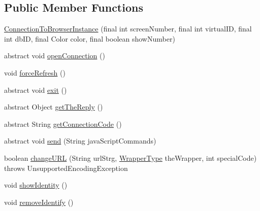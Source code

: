\subsection*{Public Member Functions}
\begin{DoxyCompactItemize}
\item 
\hyperlink{classgov_1_1fnal_1_1ppd_1_1dd_1_1display_1_1client_1_1ConnectionToBrowserInstance_a5e820932a7dcbbed0c7415a58126344f}{Connection\-To\-Browser\-Instance} (final int screen\-Number, final int virtual\-I\-D, final int db\-I\-D, final Color color, final boolean show\-Number)
\item 
abstract void \hyperlink{classgov_1_1fnal_1_1ppd_1_1dd_1_1display_1_1client_1_1ConnectionToBrowserInstance_a6ea35c69c6beea9fc6432c7cdd969d63}{open\-Connection} ()
\item 
void \hyperlink{classgov_1_1fnal_1_1ppd_1_1dd_1_1display_1_1client_1_1ConnectionToBrowserInstance_abc6c5f397d2c3caa8120f0c5fc162eac}{force\-Refresh} ()
\item 
abstract void \hyperlink{classgov_1_1fnal_1_1ppd_1_1dd_1_1display_1_1client_1_1ConnectionToBrowserInstance_aa27f7bfb9140d6e4a7cd445cdade8460}{exit} ()
\item 
abstract Object \hyperlink{classgov_1_1fnal_1_1ppd_1_1dd_1_1display_1_1client_1_1ConnectionToBrowserInstance_a4450f02846a8a1329ca4a98afc2d1177}{get\-The\-Reply} ()
\item 
abstract String \hyperlink{classgov_1_1fnal_1_1ppd_1_1dd_1_1display_1_1client_1_1ConnectionToBrowserInstance_ada329c14279c5b9c099f7d9a3444f1e5}{get\-Connection\-Code} ()
\item 
abstract void \hyperlink{classgov_1_1fnal_1_1ppd_1_1dd_1_1display_1_1client_1_1ConnectionToBrowserInstance_ab58e70a2a6f47d1dc596f16fe33dedab}{send} (String java\-Script\-Commands)
\item 
boolean \hyperlink{classgov_1_1fnal_1_1ppd_1_1dd_1_1display_1_1client_1_1ConnectionToBrowserInstance_aa79dc4484c623009bb566a078079286d}{change\-U\-R\-L} (String url\-Strg, \hyperlink{enumgov_1_1fnal_1_1ppd_1_1dd_1_1display_1_1client_1_1WrapperType}{Wrapper\-Type} the\-Wrapper, int special\-Code)  throws Unsupported\-Encoding\-Exception 
\item 
void \hyperlink{classgov_1_1fnal_1_1ppd_1_1dd_1_1display_1_1client_1_1ConnectionToBrowserInstance_a667bbe4dea46410bf5b1c6ea4e7d6a33}{show\-Identity} ()
\item 
void \hyperlink{classgov_1_1fnal_1_1ppd_1_1dd_1_1display_1_1client_1_1ConnectionToBrowserInstance_a1d644697246321d2210bd5e82426e956}{remove\-Identify} ()

\end{DoxyCompactItemize}
